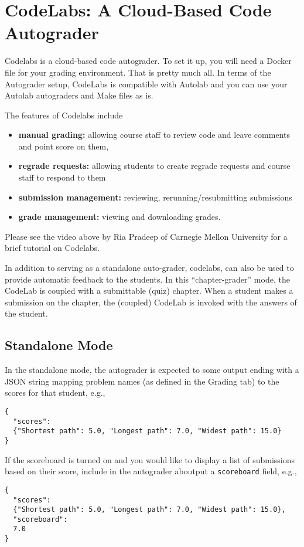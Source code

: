 \chapter{CodeLabs: A Cloud-Based Code Autograder}
\label{ch:codelabs}

Codelabs is a cloud-based code autograder.  To set it up, you will
need a Docker file for your grading environment.  That is pretty much
all.  In terms of the Autograder setup, CodeLabs is compatible with
Autolab and you can use your Autolab autograders and Make files as is.

The features of Codelabs include
\begin{itemize}
\item  
\textbf{manual grading:} allowing course staff to review code and leave comments and point
score on them,

\item
\textbf{regrade requests:} allowing students to create regrade
requests and course staff to respond to them

\item
  \textbf{submission management:} reviewing, rerunning/resubmitting submissions

\item
  \textbf{grade management:} viewing and downloading grades.
\end{itemize}
%
Please see the video above by Ria Pradeep of Carnegie Mellon University for a brief tutorial on Codelabs.

In addition to serving as a standalone auto-grader, codelabs, can also
be used to provide automatic feedback to the students.
%
In this ``chapter-grader'' mode, the CodeLab is coupled with a submittable
(quiz) chapter.
%
When a student makes a submission on the chapter, the (coupled) CodeLab is invoked with the answers of the student.

\section{Standalone Mode}
\label{sec:codelabs::standalone}

\begin{gram}
\label{sec:codelabs::standalone::output}

In the standalone mode, the autograder is expected to some output ending with a JSON string mapping problem names (as defined in the Grading tab) to the scores for that student, e.g.,
  
\begin{lstlisting}
{
  "scores":
  {"Shortest path": 5.0, "Longest path": 7.0, "Widest path": 15.0}
}
\end{lstlisting}

If the scoreboard is turned on and you would like to display a list of
submissions based on their score, include in the autograder aboutput a \lstinline`scoreboard` field, e.g.,


\begin{lstlisting}
{
  "scores":
  {"Shortest path": 5.0, "Longest path": 7.0, "Widest path": 15.0},
  "scoreboard": 
  7.0  
}
\end{lstlisting}
  
\end{gram}


